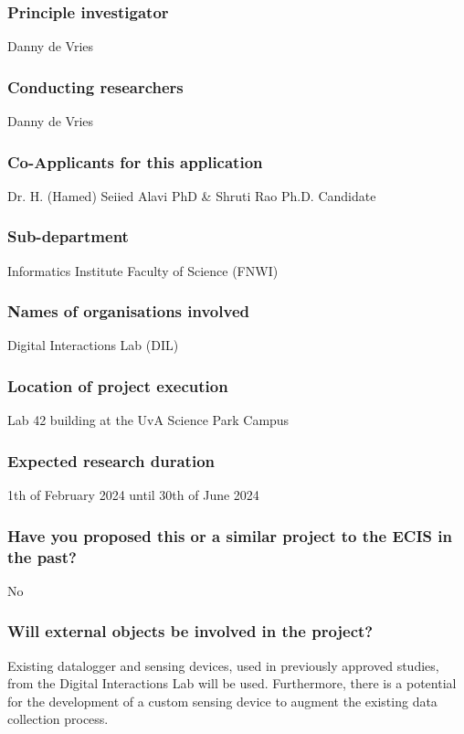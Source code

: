 \documentclass[a4paper]{article}
\begin{document}
\subsubsection{Principle investigator}

Danny de Vries

\subsubsection{Conducting researchers}

Danny de Vries

\subsubsection{Co-Applicants for this application}

Dr. H. (Hamed) Seiied Alavi PhD \& Shruti Rao Ph.D. Candidate

\subsubsection{Sub-department}

Informatics Institute Faculty of Science (FNWI)

\subsubsection{Names of organisations involved}

Digital Interactions Lab (DIL)

\subsubsection{Location of project execution}

Lab 42 building at the UvA Science Park Campus

\subsubsection{Expected research duration}

1th of February 2024 until 30th of June 2024

\subsubsection{Have you proposed this or a similar project to the ECIS in the past?}
No

\subsubsection{Will external objects be involved in the project?}
Existing datalogger and sensing devices, used in previously approved studies, from the Digital Interactions Lab will be used. Furthermore, there is a potential for the development of a custom sensing device to augment the existing data collection process.
\end{document}
